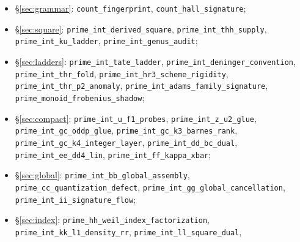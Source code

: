 \documentclass[11pt,reqno]{amsart}
\theoremstyle{plain}
\theoremstyle{definition}
\theoremstyle{remark}
\begin{document}
\begin{itemize}\raggedright
\item \S\ref{sec:grammar}: \texttt{count\_\allowbreak fingerprint}, \texttt{count\_\allowbreak hall\_\allowbreak signature};
\item \S\ref{sec:square}: \texttt{prime\_\allowbreak int\_\allowbreak derived\_\allowbreak square},
\texttt{prime\_\allowbreak int\_\allowbreak thh\_\allowbreak supply}, \texttt{prime\_\allowbreak int\_\allowbreak ku\_\allowbreak ladder},
\texttt{prime\_\allowbreak int\_\allowbreak genus\_\allowbreak audit};
\item \S\ref{sec:ladders}: \texttt{prime\_\allowbreak int\_\allowbreak tate\_\allowbreak ladder},
\texttt{prime\_\allowbreak int\_\allowbreak deninger\_\allowbreak convention}, \texttt{prime\_\allowbreak int\_\allowbreak thr\_\allowbreak fold},
\texttt{prime\_\allowbreak int\_\allowbreak hr3\_\allowbreak scheme\_\allowbreak rigidity}, \texttt{prime\_\allowbreak int\_\allowbreak thr\_\allowbreak p2\_\allowbreak anomaly},
\texttt{prime\_\allowbreak int\_\allowbreak adams\_\allowbreak family\_\allowbreak signature}, \texttt{prime\_\allowbreak monoid\_\allowbreak frobenius\_\allowbreak shadow};
\item \S\ref{sec:compact}: \texttt{prime\_\allowbreak int\_\allowbreak u\_\allowbreak f1\_\allowbreak probes},
\texttt{prime\_\allowbreak int\_\allowbreak z\_\allowbreak u2\_\allowbreak glue}, \texttt{prime\_\allowbreak int\_\allowbreak gc\_\allowbreak oddp\_\allowbreak glue},
\texttt{prime\_\allowbreak int\_\allowbreak gc\_\allowbreak k3\_\allowbreak barnes\_\allowbreak rank}, \texttt{prime\_\allowbreak int\_\allowbreak gc\_\allowbreak k4\_\allowbreak integer\_\allowbreak layer},
\texttt{prime\_\allowbreak int\_\allowbreak dd\_\allowbreak bc\_\allowbreak dual}, \texttt{prime\_\allowbreak int\_\allowbreak ee\_\allowbreak dd4\_\allowbreak lin},
\texttt{prime\_\allowbreak int\_\allowbreak ff\_\allowbreak kappa\_\allowbreak xbar};
\item \S\ref{sec:global}: \texttt{prime\_\allowbreak int\_\allowbreak bb\_\allowbreak global\_\allowbreak assembly},
\texttt{prime\_\allowbreak cc\_\allowbreak quantization\_\allowbreak defect}, \texttt{prime\_\allowbreak int\_\allowbreak gg\_\allowbreak global\_\allowbreak cancellation},
\texttt{prime\_\allowbreak int\_\allowbreak ii\_\allowbreak signature\_\allowbreak flow};
\item \S\ref{sec:index}: \texttt{prime\_\allowbreak hh\_\allowbreak weil\_\allowbreak index\_\allowbreak factorization},
\texttt{prime\_\allowbreak int\_\allowbreak kk\_\allowbreak l1\_\allowbreak density\_\allowbreak rr}, \texttt{prime\_\allowbreak int\_\allowbreak ll\_\allowbreak square\_\allowbreak dual},

\end{itemize}
\end{document}
